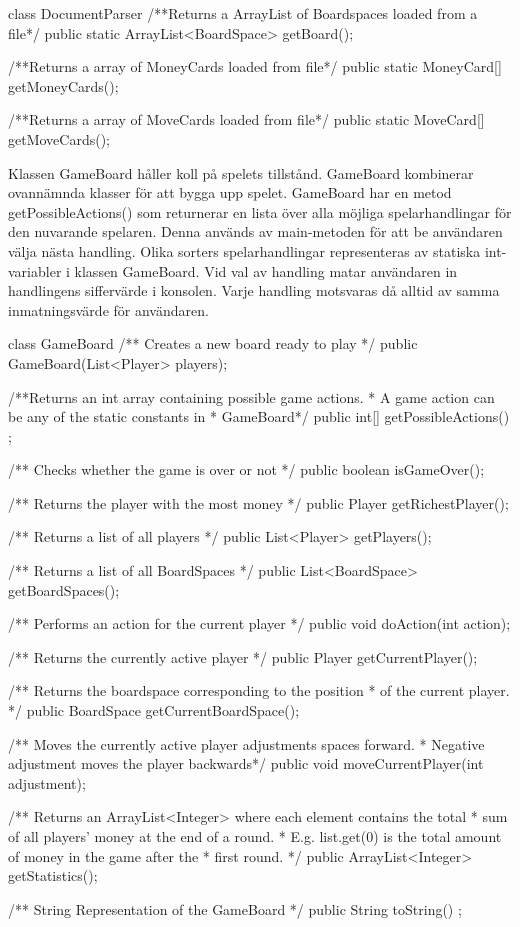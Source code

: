 \begin{JavaSpec}{class DocumentParser}
	/**Returns a ArrayList of Boardspaces loaded from a file*/
	public static ArrayList<BoardSpace> getBoard();

	/**Returns a array of MoneyCards loaded from file*/
	public static MoneyCard[] getMoneyCards();

	/**Returns a array of MoveCards loaded from file*/
	public static MoveCard[] getMoveCards();
\end{JavaSpec}


Klassen GameBoard håller koll på spelets tillstånd.
GameBoard kombinerar ovannämnda klasser för att bygga upp spelet. GameBoard har en metod getPossibleActions() som returnerar en lista över alla möjliga spelarhandlingar för den nuvarande spelaren. Denna används av main-metoden för att be användaren välja nästa handling. 
Olika sorters spelarhandlingar representeras av statiska int-variabler i klassen GameBoard. Vid val av handling matar användaren in handlingens siffervärde i konsolen. Varje handling motsvaras då alltid av samma inmatningsvärde för användaren.


\begin{JavaSpec}{class GameBoard}
    /** Creates a new board ready to play */
    public GameBoard(List<Player> players);

    /**Returns an int array containing possible game actions.
     * A game action can be any of the static constants in
     * GameBoard*/
    public int[] getPossibleActions() ;
    
    /** Checks whether the game is over or not */
    public boolean isGameOver();
    
    /** Returns the player with the most money */
    public Player getRichestPlayer();

    /** Returns a list of all players */
    public List<Player> getPlayers();

    /** Returns a list of all BoardSpaces */
    public List<BoardSpace> getBoardSpaces();

    /** Performs an action for the current player */
    public void doAction(int action);
 
    /** Returns the currently active player */
    public Player getCurrentPlayer();

    /** Returns the boardspace corresponding to the position 
      * of the current player. */
    public BoardSpace getCurrentBoardSpace();

    /** Moves the currently active player adjustments spaces forward.
      * Negative adjustment moves the player backwards*/
    public void moveCurrentPlayer(int adjustment);
    
    /** Returns an ArrayList<Integer> where each element contains the total
      * sum of all players' money at the end of a round.
      * E.g. list.get(0) is the total amount of money in the game after the 
      * first round. */
    public ArrayList<Integer> getStatistics();

    /** String Representation of the GameBoard */
    public String toString() ;
\end{JavaSpec}


